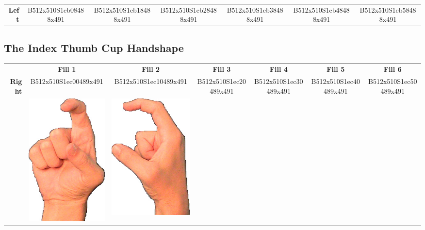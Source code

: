 \documentclass{article}
\begin{document}
\begin{center}
\begin{tabular}{r*{6}{c}}
\textbf{Left}&
B512x510S1eb08488x491&
B512x510S1eb18488x491&
B512x510S1eb28488x491&
B512x510S1eb38488x491&
B512x510S1eb48488x491&
B512x510S1eb58488x491\\
\end{tabular}
\end{center}

\subsection{The Index Thumb Cup Handshape}

\begin{center}
\begin{tabular}{r*{6}{c}}
&\textbf{Fill 1}&\textbf{Fill 2}&\textbf{Fill 3}&\textbf{Fill 4}&\textbf{Fill 5}&\textbf{Fill 6}\\
\multirow{2}{*}{\textbf{Right}}&
B512x510S1ec00489x491&
B512x510S1ec10489x491&
B512x510S1ec20489x491&
B512x510S1ec30489x491&
B512x510S1ec40489x491&
B512x510S1ec50489x491\\
&
\includegraphics[scale=0.1]{images/09-10-1.jpg}&
\includegraphics[scale=0.1]{images/09-10-2.jpg}&

\end{tabular}
\end{center}
\end{document}
